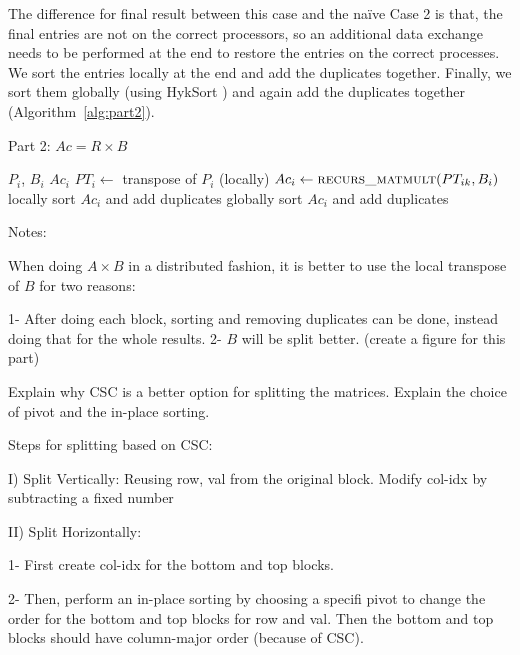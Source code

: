 The difference for final result between this case and the na\"{i}ve Case 2 is that, the final entries are not on the correct processors, so an additional data exchange needs to be performed at the end to restore the entries on the correct processes. We sort the entries locally at the end and add the duplicates together. Finally, we sort them globally (using HykSort \cite{Sundar:2013}) and again add the duplicates together (Algorithm~\ref{alg:part2}).

\begin{algorithm}[H] 
  \caption{Part 2: $Ac = R \times B$} \label{alg:part2} 
  \begin{algorithmic}[1]
    \Require $P_i$, $B_i$
    \Ensure  $Ac_i$
    \State $PT_i \leftarrow$ transpose of $P_i$ (locally)
      \State $Ac_i \leftarrow \textsc{recurs\_matmult}(PT_{ik}, B_i)$
    \EndFor
    \State locally sort $Ac_i$ and add duplicates
    \State globally sort $Ac_i$ and add duplicates
  \end{algorithmic}
\end{algorithm}

Notes:

When doing $A \times B$ in a distributed fashion, it is better to use the local transpose of $B$ for two reasons:

1- After doing each block, sorting and removing duplicates can be done, instead doing that for the whole results.
2- $B$ will be split better. (create a figure for this part)

Explain why CSC is a better option for splitting the matrices. Explain the choice of pivot and the in-place sorting.

Steps for splitting based on CSC:

I) Split Vertically: Reusing row, val from the original block. Modify col-idx by subtracting a fixed number

II) Split Horizontally: 

1- First create col-idx for the bottom and top blocks.

2- Then, perform an in-place sorting by choosing a specifi pivot to change the order for the bottom and top blocks for row and val. Then the bottom and top blocks should have column-major order (because of CSC).
